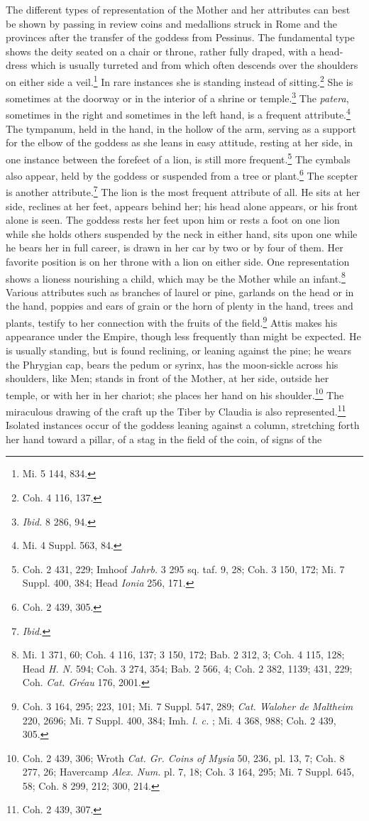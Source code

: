 \documentclass[a4paper, 11pt, oneside, polutonikogreek, english]{article}
\begin{document}
The different types of representation of the Mother and her attributes can best be shown by passing in review coins and medallions struck in Rome and the provinces after the transfer of the goddess from Pessinus. The fundamental type shows the deity seated on a chair or throne, rather fully draped, with a head-dress which is usually turreted and from which often descends over the shoulders on either side a veil.\footnote{Mi. 5 144, 834.} In rare instances she is standing instead of sitting.\footnote{Coh. 4 116, 137.} She is sometimes at the doorway or in the interior of a shrine or temple.\footnote{\emph{Ibid.} 8 286, 94.} The \emph{patera}, sometimes in the right and sometimes in the left hand, is a frequent attribute.\footnote{Mi. 4 Suppl. 563, 84.} The tympanum, held in the hand, in the hollow of the arm, serving as a support for the elbow of the goddess as she leans in easy attitude, resting at her side, in one instance between the forefeet of a lion, is still more frequent.\footnote{Coh. 2 431, 229; Imhoof \emph{Jahrb.} 3 295 sq. taf. 9, 28; Coh. 3 150, 172; Mi. 7 Suppl. 400, 384; Head \emph{Ionia} 256, 171.} The cymbals also appear, held by the goddess or suspended from a tree or plant.\footnote{Coh. 2 439, 305.} The scepter is another attribute.\footnote{\emph{Ibid.}} The lion is the most frequent attribute of all. He sits at her side, reclines at her feet, appears behind her; his head alone appears, or his front alone is seen. The goddess rests her feet upon him or rests a foot on one lion while she holds others suspended by the neck in either hand, sits upon one while he bears her in full career, is drawn in her car by two or by four of them. Her favorite position is on her throne with a lion on either side. One representation shows a lioness nourishing a child, which may be the Mother while an infant.\footnote{Mi. 1 371, 60; Coh. 4 116, 137; 3 150, 172; Bab. 2 312, 3; Coh. 4 115, 128; Head \emph{H. N.} 594; Coh. 3 274, 354; Bab. 2 566, 4; Coh. 2 382, 1139; 431, 229; Coh. \emph{Cat. Gréau} 176, 2001.} Various attributes such as branches of laurel or pine, garlands on the head or in the hand, poppies and ears of grain or the horn of plenty in the hand, trees and plants, testify to her connection with the fruits of the field.\footnote{Coh. 3 164, 295; 223, 101; Mi. 7 Suppl. 547, 289; \emph{Cat. Waloher de Maltheim} 220, 2696; Mi. 7 Suppl. 400, 384; Imh. \emph{l. c.} ; Mi. 4 368, 988; Coh. 2 439, 305.} Attis makes his appearance under the Empire, though less frequently than might be expected. He is usually standing, but is found reclining, or leaning against the pine; he wears the Phrygian cap, bears the pedum or syrinx, has the moon-sickle across his shoulders, like Men; stands in front of the Mother, at her side, outside her temple, or with her in her chariot; she places her hand on his shoulder.\footnote{Coh. 2 439, 306; Wroth \emph{Cat. Gr. Coins of Mysia} 50, 236, pl. 13, 7; Coh. 8 277, 26; Havercamp \emph{Alex. Num.} pl. 7, 18; Coh. 3 164, 295; Mi. 7 Suppl. 645, 58; Coh. 8 299, 212; 300, 214.} The miraculous drawing of the craft up the Tiber by Claudia is also represented.\footnote{Coh. 2 439, 307.} Isolated instances occur of the goddess leaning against a column, stretching forth her hand toward a pillar, of a stag in the field of the coin, of signs of the 
\end{document}
